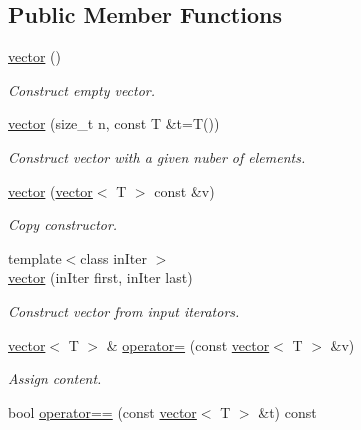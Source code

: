 \subsection*{Public Member Functions}
\begin{DoxyCompactItemize}
\item 
\hyperlink{classmerlin_1_1vector_ac48f70c583d3781dde90008b91a1b7a8}{vector} ()\hypertarget{classmerlin_1_1vector_ac48f70c583d3781dde90008b91a1b7a8}{}\label{classmerlin_1_1vector_ac48f70c583d3781dde90008b91a1b7a8}

\begin{DoxyCompactList}\small\item\em Construct empty vector. \end{DoxyCompactList}\item 
\hyperlink{classmerlin_1_1vector_a0e384bcf03c3f2886dedf1b24fc61057}{vector} (size\+\_\+t n, const T \&t=T())\hypertarget{classmerlin_1_1vector_a0e384bcf03c3f2886dedf1b24fc61057}{}\label{classmerlin_1_1vector_a0e384bcf03c3f2886dedf1b24fc61057}

\begin{DoxyCompactList}\small\item\em Construct vector with a given nuber of elements. \end{DoxyCompactList}\item 
\hyperlink{classmerlin_1_1vector_aebdbc7cbb94b53343d7a0b5059ea2e0f}{vector} (\hyperlink{classmerlin_1_1vector}{vector}$<$ T $>$ const \&v)
\begin{DoxyCompactList}\small\item\em Copy constructor. \end{DoxyCompactList}\item 
{\footnotesize template$<$class in\+Iter $>$ }\\\hyperlink{classmerlin_1_1vector_a7af3ec7e6c6a760d277ed21479ee7500}{vector} (in\+Iter first, in\+Iter last)\hypertarget{classmerlin_1_1vector_a7af3ec7e6c6a760d277ed21479ee7500}{}\label{classmerlin_1_1vector_a7af3ec7e6c6a760d277ed21479ee7500}

\begin{DoxyCompactList}\small\item\em Construct vector from input iterators. \end{DoxyCompactList}\item 
\hyperlink{classmerlin_1_1vector}{vector}$<$ T $>$ \& \hyperlink{classmerlin_1_1vector_a0f114ae4ee7406d5ba5d48b326fc3173}{operator=} (const \hyperlink{classmerlin_1_1vector}{vector}$<$ T $>$ \&v)
\begin{DoxyCompactList}\small\item\em Assign content. \end{DoxyCompactList}\item 
bool \hyperlink{classmerlin_1_1vector_a8def264e9a1d31a332ceb587f58f0306}{operator==} (const \hyperlink{classmerlin_1_1vector}{vector}$<$ T $>$ \&t) const \hypertarget{classmerlin_1_1vector_a8def264e9a1d31a332ceb587f58f0306}{}\label{classmerlin_1_1vector_a8def264e9a1d31a332ceb587f58f0306}


\end{DoxyCompactItemize}
